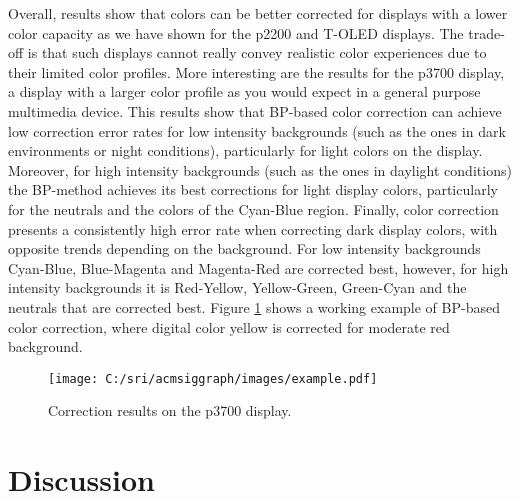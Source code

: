\documentclass[annual]{acmsiggraph}
\begin{document}
Overall, results show that colors can be better corrected for displays with a lower color capacity as we have shown for the p2200 and T-OLED displays. The trade-off is that such displays cannot really convey realistic color experiences due to their limited color profiles. More interesting are the results for the p3700 display, a display with a larger color profile as you would expect in a general purpose multimedia device. This results show that BP-based color correction can achieve low correction error rates for low intensity backgrounds (such as the ones in dark environments or night conditions), particularly for light colors on the display. Moreover, for high intensity backgrounds (such as the ones in daylight conditions) the BP-method achieves its best corrections for light display colors, particularly for the neutrals and the colors of the Cyan-Blue region. Finally, color correction presents a consistently high error rate when correcting dark display colors, with opposite trends depending on the background. For low intensity backgrounds Cyan-Blue, Blue-Magenta and Magenta-Red are corrected best, however, for high intensity backgrounds it is Red-Yellow, Yellow-Green, Green-Cyan and the neutrals that are corrected best. Figure \ref{fig:Figure14} shows a working example of BP-based color correction, where digital color yellow is corrected for moderate red background.
\begin{figure}[ht]
  \centering
  \texttt{[image: C:/sri/acmsiggraph/images/example.pdf]}
  \caption{Correction results on the p3700 display.}
    \label{fig:Figure14}
\end{figure}

\section{Discussion}
\end{document}
